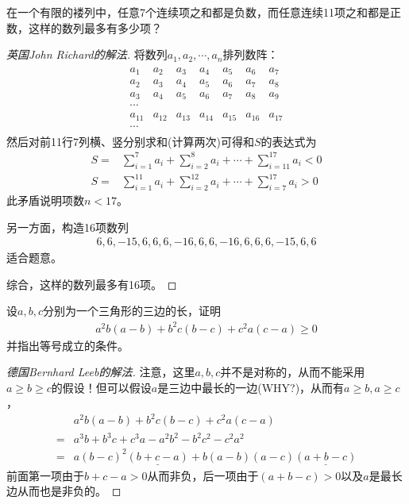 \begin{example}[IMO 1977]
  在一个有限的褛列中，任意7个连续项之和都是负数，而任意连续11项之和都是正数，这样的数列最多有多少项？
\end{example}
\begin{proof}[英国John Richard的解法]
  将数列$a_1,a_2,\cdots,a_n$排列数阵：
  \begin{align*}
    \begin{matrix}
      a_1 & a_2 & a_3 & a_4 & a_5 & a_6 & a_7\\
      a_2 & a_3 & a_4 & a_5 & a_6 & a_7 & a_8\\
      a_3 & a_4 & a_5 & a_6 & a_7 & a_8 & a_9\\
      \cdots\\
      a_{11} & a_{12} & a_{13} & a_{14} & a_{15} & a_{16} & a_{17}\\
      \cdots
    \end{matrix}
  \end{align*}
  然后对前11行7列横、竖分别求和(计算两次)可得和$S$的表达式为
  \begin{align*}
    S={}&\sum_{i=1}^7 a_i + \sum_{i=2}^8 a_i + \cdots + \sum_{i=11}^{17} a_i < 0\\
    S={}&\sum_{i=1}^{11} a_i + \sum_{i=2}^{12} a_i + \cdots + \sum_{i=7}^{17} a_i > 0
  \end{align*}
  此矛盾说明项数$n<17$。

  另一方面，构造16项数列
  \begin{align*}
    6,6,-15,6,6,6,-16,6,6,-16,6,6,6,-15,6,6
  \end{align*}
  适合题意。

  综合，这样的数列最多有16项。
\end{proof}


\begin{example}[IMO 1983]
  设$a,b,c$分别为一个三角形的三边的长，证明
  \begin{align*}
    a^2b(a-b) + b^2c(b-c) + c^2a(c-a)\ge 0
  \end{align*}
  并指出等号成立的条件。
\end{example}
\begin{proof}[德国Bernhard Leeb的解法]
  注意，这里$a,b,c$并不是对称的，从而不能采用$a\ge b\ge c$的假设！但可以假设$a$是三边中最长的一边(WHY?)，从而有$a\ge b, a\ge c$，
  \begin{align*}
       & a^2b(a-b) + b^2c(b-c) + c^2a(c-a)\\
    ={}& a^3b + b^3c + c^3a - a^2b^2 - b^2c^2 - c^2a^2\\
    ={}& a(b-c)^2\underline{(b+c-a)} + b(a-b)(a-c)\underline{(a+b-c)}
  \end{align*}
  前面第一项由于$b+c-a>0$从而非负，后一项由于$(a+b-c)>0$以及$a$是最长边从而也是非负的。
\end{proof}

